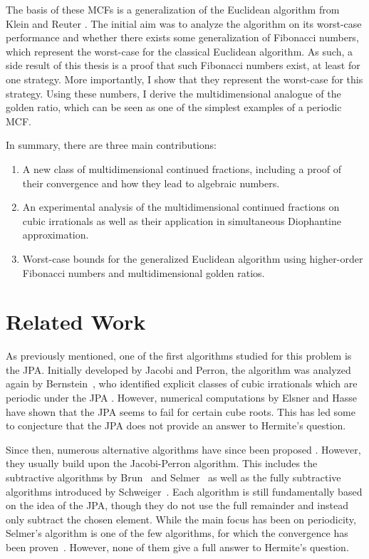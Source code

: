 The basis of these MCFs is a generalization of the Euclidean algorithm from
Klein and Reuter \cite{Klein24}.
The initial aim was to analyze the algorithm on its worst-case performance
and whether there exists some generalization of Fibonacci numbers,
which represent the worst-case for the classical Euclidean algorithm.
As such, a side result of this thesis is a proof that such Fibonacci numbers exist, at least for one strategy.
More importantly, I show that they represent the worst-case for this strategy.
Using these numbers, I derive the multidimensional analogue of the golden
ratio, which can be seen as one of the simplest examples of a periodic MCF.

In summary, there are three main contributions:
\begin{enumerate}
  \item A new class of multidimensional continued fractions, including a proof
    of their convergence and how they lead to algebraic numbers.
  \item An experimental analysis of the multidimensional continued fractions
    on cubic irrationals as well as their application in simultaneous
    Diophantine approximation.
  \item Worst-case bounds for the generalized Euclidean algorithm
    using higher-order Fibonacci numbers and multidimensional golden ratios.
\end{enumerate}

\section{Related Work}
\label{sec:related-work}

As previously mentioned,
one of the first algorithms studied for this problem is the JPA.
Initially developed by Jacobi and Perron,
the algorithm was analyzed again by Bernstein~\cite{Bernstein71},
who identified explicit classes of cubic irrationals which are periodic under
the JPA \cite{Bernstein64A, Bernstein65, Bernstein64B}.
However, numerical computations by Elsner and Hasse \cite{Elsner67} have shown
that the JPA seems to fail for certain cube roots.
This has led some to conjecture that the JPA does not provide an answer to Hermite's question.

Since then, numerous alternative algorithms have since been proposed
\cite{Assaf05, Hendy81, Schweiger13, Schweiger00}.
However, they usually build upon the Jacobi-Perron algorithm.
This includes the subtractive algorithms by
Brun~\cite{Brun19} and Selmer~\cite{Selmer67}
as well as the fully subtractive algorithms introduced by Schweiger~\cite{Schweiger95}.
Each algorithm is still fundamentally based on the idea of the JPA, though they
do not use the full remainder and instead only subtract the chosen element.
While the main focus has been on periodicity, Selmer's algorithm is one of the
few algorithms, for which the convergence has been proven~\cite{Bruin15}.
However, none of them give a full answer to Hermite's question.

